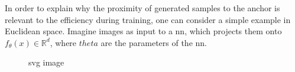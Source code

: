 In order to explain why the proximity of generated samples to the anchor is relevant to the efficiency during training, 
one can consider a simple example in Euclidean space.
Imagine images as input to a \ac{nn}, which projects them onto $f_{\theta}(x) \in \mathbb{R}^d$, where $theta$ are the parameters of the \ac{nn}.

\begin{figure}[htbp]
    \centering
    
    \caption{svg image}
\end{figure}